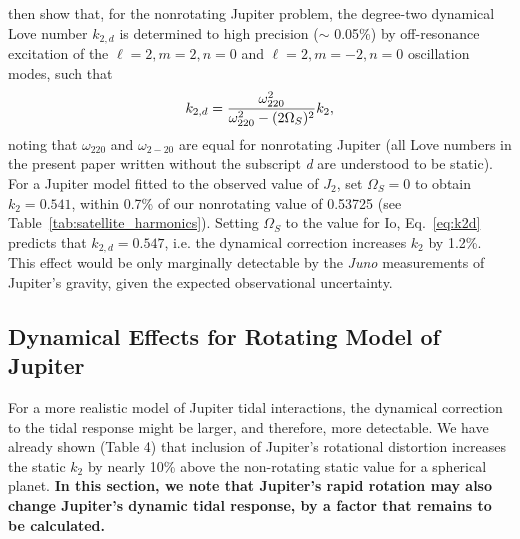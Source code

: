 \citet{vorontsov1984} then show that, for the nonrotating Jupiter problem, the
degree-two dynamical Love number $k_{2,d}$ is determined to high precision ($\sim$
0.05\%) by off-resonance excitation of the $\ell=2, m=2, n=0$ and $\ell=2, m=-2, n=0$
oscillation modes, such that
%
\begin{equation}
    k_{2,d}={{\omega^2_{220}} \over {\omega^2_{220} - (2 \Omega_S)^2}} k_2,
\label{eq:k2d}
\end{equation}
%
noting that $\omega_{220}$ and $\omega_{2-20}$ are equal for nonrotating Jupiter (all
Love numbers in the present paper written without the subscript {\it d} are
understood to be static).  For a Jupiter model fitted to the observed value of $J_2$,
\citet{vorontsov1984} set $\Omega_S = 0$ to obtain $k_2  = 0.541$, within 0.7\% of
our nonrotating value of 0.53725 (see Table~\ref{tab:satellite_harmonics}).  Setting
$\Omega_S$ to the value for Io, Eq.~\ref{eq:k2d} predicts that $k_{2,d} = 0.547$,
i.e. the dynamical correction increases $k_2$ by 1.2\%.  This effect would be only
marginally detectable by the \textit{Juno} measurements of Jupiter's gravity, given
the expected observational uncertainty.

\subsection{{\bf Dynamical Effects} for Rotating Model of Jupiter}

For a more realistic model of Jupiter tidal interactions, the dynamical correction to
the tidal response might be larger, and therefore, more detectable.  We have already
shown (Table 4) that inclusion of Jupiter's rotational distortion increases the
static $k_2$ by nearly 10\% above the non-rotating static value for a spherical
planet.  {\bf In this section, we note that
Jupiter's rapid rotation may also change Jupiter's dynamic tidal response,
by a factor that remains to be calculated.}

